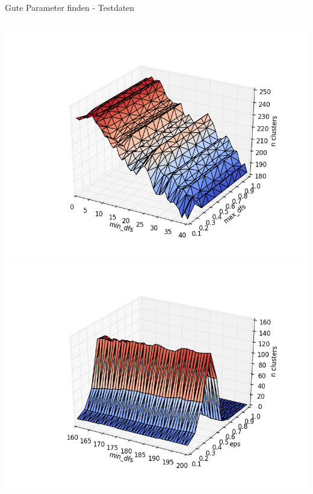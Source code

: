 \documentclass[compress,t]{beamer}
\begin{document}
\begin{frame}{Gute Parameter finden - Testdaten}
\begin{columns}[t]
        \includegraphics[width=1.0\textwidth]{img/df_3_cosin_nofc.png}\\
        \includegraphics[width=1.0\textwidth]{img/df_eps_1_cosin_nofc.png}
    \end{columns}

\end{frame}
\end{document}
